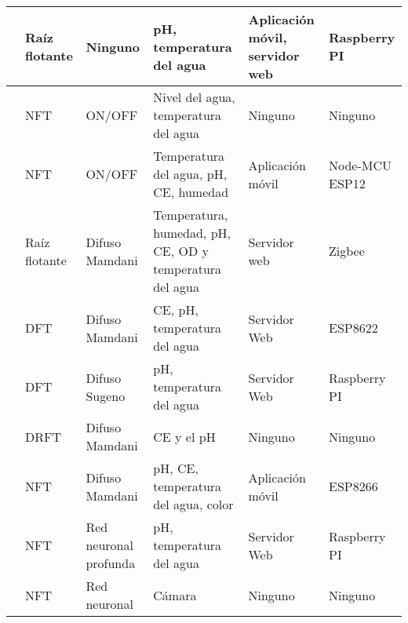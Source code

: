 \begin{landscape}
\begin{longtable}{p{}|p{}|p{}|p{}|p{}|p{}}
        \hline
        
        \cite{dinccer2019smart} & Raíz flotante   & Ninguno &  pH, temperatura del agua& Aplicación móvil, servidor web & Raspberry PI\\
        
         \hline
         
         \cite{untoro2022iot}& NFT   & ON/OFF &Nivel del agua, temperatura del agua & Ninguno & Ninguno\\
         
         \hline
         
        \cite{patil2020monitoring} &  NFT & ON/OFF & Temperatura del agua, pH, CE, humedad&Aplicación móvil& Node-MCU ESP12\\
      
        \hline
        
          \cite{tatas2022reliable} & Raíz flotante   & Difuso Mamdani & Temperatura, humedad, pH, CE, OD y temperatura del agua& Servidor web & Zigbee\\
          
         \hline
         
         \cite{al2020kendali} &  DFT & Difuso Mamdani & CE, pH, temperatura del agua & Servidor Web & ESP8622\\
     
    \hline
    
        \cite{nurhasan2018implementation} &  DFT & Difuso Sugeno& pH, temperatura del agua &Servidor Web& Raspberry PI\\

    \hline
      
        \cite{fuangthong2018automatic} & DRFT   & Difuso Mamdani &  CE y el pH & Ninguno& Ninguno\\      
      
    \hline
    
        \cite{simanjuntak2022design} & NFT & Difuso Mamdani &  pH, CE, temperatura del agua, color & Aplicación móvil & ESP8266\\
         \hline

        \cite{mehra2018iot} & NFT   & Red neuronal profunda &  pH, temperatura del agua & Servidor Web & Raspberry PI\\
        
    \hline
    
         \cite{tenzer2020digital} &  NFT & Red neuronal & Cámara& Ninguno& Ninguno\\
         

\end{longtable}
\end{landscape}
